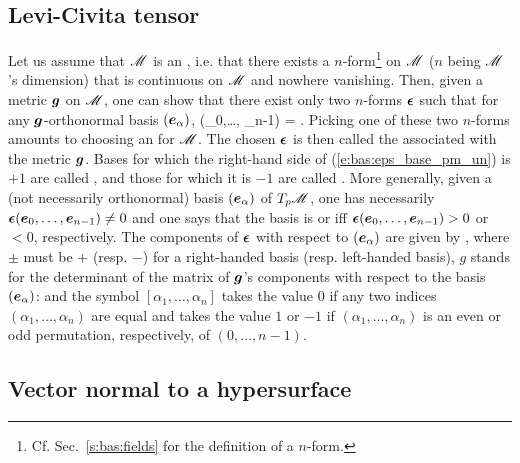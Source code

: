 \subsection{Levi-Civita tensor} \label{s:bas:Levi-Civita_tensor}

Let us assume that $\mathscr{M}$ is an , i.e. that there exists a $n$-form\footnote{Cf. Sec.~\ref{s:bas:fields} for the definition of a $n$-form.} on $\mathscr{M}$ ($n$ being
$\mathscr{M}$'s dimension) that is continuous on $\mathscr{M}$ and nowhere vanishing.
Then, given a metric $\bm{g}$ on $\mathscr{M}$, one can show that there exist only two
$n$-forms $\bm{\epsilon}$ such that for any $\bm{g}$-orthonormal basis $(\bm{e}_\alpha)$,
\be \label{e:bas:eps_base_pm_un}
  \w{\epsilon}(_0,\ldots, _{n-1}) =  .
\ee
Picking one of these two $n$-forms amounts to choosing an
 for $\mathscr{M}$. The chosen $\bm{\epsilon}$
is then called the  associated with
the metric $\bm{g}$.
Bases for which the right-hand side of (\ref{e:bas:eps_base_pm_un})
is $+1$ are called , and those for which it is $-1$ are called
.
More generally, given a (not necessarily orthonormal) basis $(\bm{e}_\alpha)$ of $T_p\mathscr{M}$,
one has necessarily $\bm{\epsilon}(\bm{e}_0,\ldots, \bm{e}_{n-1}) \not =0$
and one says that the basis is 
or 
iff $\bm{\epsilon}(\bm{e}_0,\ldots, \bm{e}_{n-1}) > 0$ or $<0$, respectively.
The components of $\bm{\epsilon}$ with
respect to $(\bm{e}_\alpha)$ are given by
\be \label{e:bas:eps_sqrt_g}
  ,
\ee
where $\pm$ must be $+$ (resp. $-$) for a right-handed basis (resp. left-handed basis),
$g$ stands for the determinant of the matrix of $\bm{g}$'s components with respect
to the basis $(\bm{e}_\alpha)$:
\be \label{e:bas:def_det_g}
\ee
and the symbol $[\alpha_1, \ldots, \alpha_n]$ takes the value $0$ if any two indices
$(\alpha_1, \ldots, \alpha_n)$ are equal and takes the value $1$ or $-1$ if
$(\alpha_1, \ldots, \alpha_n)$ is an even or odd permutation, respectively, of
$(0,\ldots,n-1)$.

\subsection{Vector normal to a hypersurface} \label{s:bas:hyp_normal}


